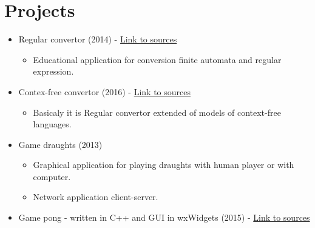 \documentclass[11pt,a4paper,sans]{moderncv}        %
\begin{document}
\section{Projects}
{
\begin{itemize}
	\item Regular convertor (2014) - \href{https://github.com/navrkald/regularConvertor}{Link to sources}
	\begin{itemize}
		\item Educational application for conversion finite automata and regular expression.
	\end{itemize}
	\item Contex-free convertor (2016) - \href{https://github.com/navrkald/regularConvertor}{Link to sources}
	\begin{itemize}
		\item Basicaly it is Regular convertor extended of models of context-free languages.
	\end{itemize}
	\item Game draughts (2013)
	\begin{itemize}
		\item Graphical application for playing draughts with human player or with computer.
		\item Network application client-server.
	\end{itemize}	 
\end{itemize}
}
{
\begin{itemize}
	\item Game pong - written in C++ and GUI in wxWidgets (2015) - \href{https://github.com/navrkald/Game-pong}{Link to sources}  	 
\end{itemize}
}
\end{document}
